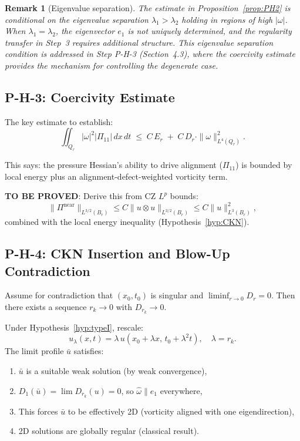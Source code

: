 \documentclass[11pt]{article}
\newtheorem{remark}[lemma]{Remark}
\theoremstyle{definition}
\begin{document}
\begin{remark}[Eigenvalue separation]
\label{rem:eigsep}
The estimate in Proposition~\ref{prop:PH2} is conditional on the eigenvalue separation
$\lambda_1 > \lambda_2$ holding in regions of high $|\omega|$.  When $\lambda_1 = \lambda_2$,
the eigenvector $e_1$ is not uniquely determined, and the regularity transfer in Step~3
requires additional structure.  This eigenvalue separation condition is addressed in
Step P-H-3 (Section~4.3), where the coercivity estimate provides the mechanism for
controlling the degenerate case.
\end{remark}

\subsection{P-H-3: Coercivity Estimate}

The key estimate to establish:
\[
  \iint_{Q_r} |\omega|^2 |\Pi_{11}|\, dx\, dt
  \;\leq\;
  C\, E_r \;+\; C\, D_r \cdot \|\omega\|_{L^4(Q_r)}^2.
\]

This says: the pressure Hessian's ability to drive alignment ($\Pi_{11}$) is bounded by local energy plus an alignment-defect-weighted vorticity term.

\textbf{TO BE PROVED}: Derive this from CZ $L^p$ bounds:
\[
  \|\Pi^{\mathrm{near}}\|_{L^{3/2}(B_r)} \leq C \|u \otimes u\|_{L^{3/2}(B_r)} \leq C \|u\|_{L^3(B_r)}^2,
\]
combined with the local energy inequality (Hypothesis~\ref{hyp:CKN}).

\subsection{P-H-4: CKN Insertion and Blow-Up Contradiction}

Assume for contradiction that $(x_0, t_0)$ is singular and $\liminf_{r\to 0} D_r = 0$.
Then there exists a sequence $r_k \to 0$ with $D_{r_k} \to 0$.

Under Hypothesis~\ref{hyp:typeI}, rescale:
\[
  u_\lambda(x,t) = \lambda\, u(x_0 + \lambda x,\, t_0 + \lambda^2 t), \quad \lambda = r_k.
\]
The limit profile $\bar{u}$ satisfies:
\begin{enumerate}
  \item $\bar{u}$ is a suitable weak solution (by weak convergence),
  \item $D_1(\bar{u}) = \lim D_{r_k}(u) = 0$, so $\hat{\omega} \| e_1$ everywhere,
  \item This forces $\bar{u}$ to be effectively 2D (vorticity aligned with one eigendirection),
  \item 2D solutions are globally regular (classical result).
\end{enumerate}
\end{document}
